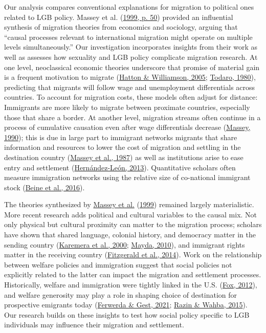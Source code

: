 \documentclass[
  11pt,
]{article}
\begin{document}
Our analysis compares conventional explanations for migration to political ones related to LGB policy. Massey et al. (\protect\hyperlink{ref-massey_1999}{1999, p. 50}) provided an influential synthesis of migration theories from economics and sociology, arguing that ``causal processes relevant to international migration might operate on multiple levels simultaneously.'' Our investigation incorporates insights from their work as well as assesses how sexuality and LGB policy complicate migration research. At one level, neoclassical economic theories underscore that promise of material gain is a frequent motivation to migrate (\protect\hyperlink{ref-hatton_2005a}{Hatton \& Williamson, 2005}; \protect\hyperlink{ref-todaro_1980}{Todaro, 1980}), predicting that migrants will follow wage and unemployment differentials across countries. To account for migration costs, these models often adjust for distance: Immigrants are more likely to migrate between proximate countries, especially those that share a border. At another level, migration streams often continue in a process of cumulative causation even after wage differentials decrease (\protect\hyperlink{ref-massey_1990_social}{Massey, 1990}); this is due in large part to immigrant networks migrants that share information and resources to lower the cost of migration and settling in the destination country (\protect\hyperlink{ref-massey_1987}{Massey et al., 1987}) as well as institutions arise to ease entry and settlement (\protect\hyperlink{ref-hernandez-leon_2013}{Hernández-León, 2013}). Quantitative scholars often measure immigration networks using the relative size of co-national immigrant stock (\protect\hyperlink{ref-beine_2016}{Beine et al., 2016}).

The theories synthesized by \protect\hyperlink{ref-massey_1999}{Massey et al.} (\protect\hyperlink{ref-massey_1999}{1999}) remained largely materialistic. More recent research adds political and cultural variables to the causal mix. Not only physical but cultural proximity can matter to the migration process; scholars have shown that shared language, colonial history, and democracy matter in the sending country (\protect\hyperlink{ref-karemera_2000}{Karemera et al., 2000}; \protect\hyperlink{ref-mayda_2010}{Mayda, 2010}), and immigrant rights matter in the receiving country (\protect\hyperlink{ref-fitzgerald_2014}{Fitzgerald et al., 2014}). Work on the relationship between welfare policies and immigration suggest that social policies not explicitly related to the latter can impact the migration and settlement processes. Historically, welfare and immigration were tightly linked in the U.S. (\protect\hyperlink{ref-fox_2012}{Fox, 2012}), and welfare generosity may play a role in shaping choice of destination for prospective emigrants today (\protect\hyperlink{ref-ferwerda_2021_pull}{Ferwerda \& Gest, 2021}; \protect\hyperlink{ref-razin_2015}{Razin \& Wahba, 2015}). Our research builds on these insights to test how social policy specific to LGB individuals may influence their migration and settlement.
\end{document}
